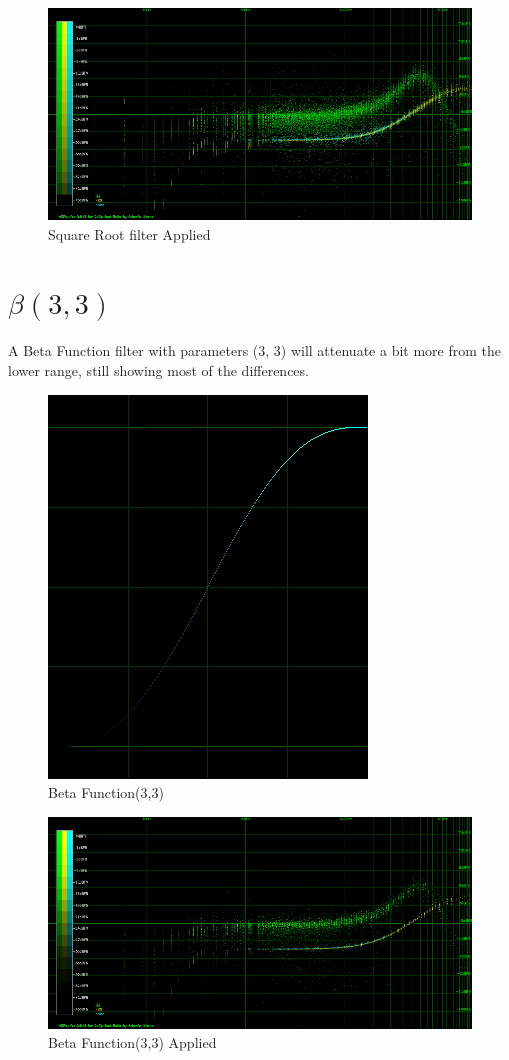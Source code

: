 \documentclass[10pt,a4paper]{report}
\begin{document}
\begin{appendices}
\begin{figure}[H]
	\centering
	\includegraphics[width=1\linewidth]{plots/BetaFunctionPlot_1_Data.png}
	\caption[Square Root filter]{Square Root filter Applied}
	\label{fig:betafunctionplot1data}
\end{figure}

\newpage
\section{$\beta(3,3)$}

A Beta Function filter with parameters (3, 3) will attenuate a bit more from the lower range, still showing most of the differences.

\begin{figure}[H]
	\centering
	\includegraphics[width=0.4\linewidth]{plots/BetaFunctionPlot_2.png}
	\caption[Beta Function(3,3)]{Beta Function(3,3)}
	\label{fig:betafunctionplot2}
\end{figure}

\begin{figure}[H]
	\centering
	\includegraphics[width=1\linewidth]{plots/BetaFunctionPlot_2_Data.png}
	\caption[Beta Function(3,3)]{Beta Function(3,3) Applied}
	\label{fig:betafunctionplot2data}
\end{figure}


\end{appendices}
\end{document}
